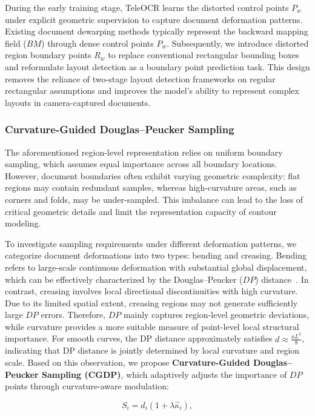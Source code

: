 \documentclass{fairmeta}
\begin{document}
During the early training stage, TeleOCR learns the distorted control points $P_w$ under explicit geometric supervision to capture document deformation patterns. Existing document dewarping methods typically represent the backward mapping field ($BM$) through dense control points $P_w$. Subsequently, we introduce distorted region boundary points $R_w$ to replace conventional rectangular bounding boxes and reformulate layout detection as a boundary point prediction task. This design removes the reliance of two-stage layout detection frameworks on regular rectangular assumptions and improves the model’s ability to represent complex layouts in camera-captured documents.

\subsubsection{Curvature-Guided Douglas--Peucker Sampling}
The aforementioned region-level representation relies on uniform boundary sampling, which assumes equal importance across all boundary locations. However, document boundaries often exhibit varying geometric complexity: flat regions may contain redundant samples, whereas high-curvature areas, such as corners and folds, may be under-sampled. This imbalance can lead to the loss of critical geometric details and limit the representation capacity of contour modeling.

To investigate sampling requirements under different deformation patterns, we categorize document deformations into two types: bending and creasing. Bending refers to large-scale continuous deformation with substantial global displacement, which can be effectively characterized by the Douglas--Peucker ($DP$) distance~\cite{hershberger1992speeding}. In contrast, creasing involves local directional discontinuities with high curvature. Due to its limited spatial extent, creasing regions may not generate sufficiently large $DP$ errors. Therefore, $DP$ mainly captures region-level geometric deviations, while curvature provides a more suitable measure of point-level local structural importance. For smooth curves, the DP distance approximately satisfies $d\approx\frac{\kappa L^{2}}{8}$, indicating that DP distance is jointly determined by local curvature and region scale. Based on this observation, we propose \textbf{Curvature-Guided Douglas--Peucker Sampling (CGDP)}, which adaptively adjusts the importance of $DP$ points through curvature-aware modulation:

\begin{equation}
S_i=d_i(1+\lambda\hat{\kappa}_i),
\end{equation}
\end{document}
